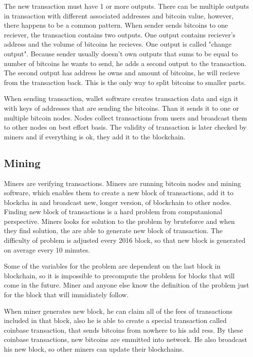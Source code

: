 \documentclass[
  digital, %
  table,   %
  lof,     %
  lot,     %
  oneside
]{fithesis3}
\begin{document}
The new transaction must have 1 or more outputs.
There can be multiple outputs in transaction with different associated addresses and bitcoin value,
however, there happens to be a common pattern. When sender sends bitcoins to one reciever,
the transaction contains two outputs.
One output contains reciever's address and the volume of bitcoins he recieves.
One output is called "change output". Because sender usually doesn't own outputs 
 that sums to be equal to number of bitcoins he wants to send, he adds a second output
 to the transaction. The second output has address he owns and amount of bitcoins, he will recieve from the transaction back.
 This is the only way to split bitcoins to smaller parts. 

When sending transaction,
 wallet software creates transaction data and sign it with keys of addresses that are sending the bitcoins.
 Than it sends it to one or multiple bitcoin nodes.
Nodes collect transactions from users and broadcast them to other nodes on best effort basis.
The validity of transaction is later checked by miners and if everything is ok, they add it to the blockchain.

\subsection{Mining}

Miners are verifying transactions.
Miners are running bitcoin nodes and mining software, which enables them to create a new block of transactions, add it to blockcha
in and broadcast new, longer version, of blockchain to other nodes.
Finding new block of transactions is a hard problem from computanional perspective.
Miners looks for solution to the problem by bruteforce and when they find solution, the are able to generate
new block of transaction. The difficulty of problem is adjusted every 2016 block,
so that new block is generated on average every 10 minutes.

Some of the variables for the problem are dependent on the last block in blockchain, so it is impossible
to precompute the problem for blocks that will come in the future. 
Miner and anyone else know the definition of the problem just for the block that will immidiately follow.

When miner generates new block, he can claim all of the fees of transactions included in that block,
also he is able to create a special transaction called coinbase transaction, that sends bitcoins from nowhere to his add
ress. By these coinbase transactions, new bitcoins are emmitted into network.
He also broadcast his new block, so other miners can update their blockchains. 
\end{document}
